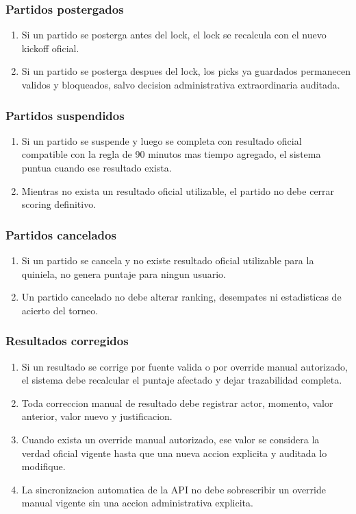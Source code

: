 \subsubsection{Partidos postergados}

\begin{enumerate}
  \item Si un partido se posterga antes del lock, el lock se recalcula con el nuevo kickoff oficial.
  \item Si un partido se posterga despues del lock, los picks ya guardados permanecen validos y bloqueados, salvo decision administrativa extraordinaria auditada.
\end{enumerate}

\subsubsection{Partidos suspendidos}

\begin{enumerate}
  \item Si un partido se suspende y luego se completa con resultado oficial compatible con la regla de 90 minutos mas tiempo agregado, el sistema puntua cuando ese resultado exista.
  \item Mientras no exista un resultado oficial utilizable, el partido no debe cerrar scoring definitivo.
\end{enumerate}

\subsubsection{Partidos cancelados}

\begin{enumerate}
  \item Si un partido se cancela y no existe resultado oficial utilizable para la quiniela, no genera puntaje para ningun usuario.
  \item Un partido cancelado no debe alterar ranking, desempates ni estadisticas de acierto del torneo.
\end{enumerate}

\subsubsection{Resultados corregidos}

\begin{enumerate}
  \item Si un resultado se corrige por fuente valida o por override manual autorizado, el sistema debe recalcular el puntaje afectado y dejar trazabilidad completa.
  \item Toda correccion manual de resultado debe registrar actor, momento, valor anterior, valor nuevo y justificacion.
  \item Cuando exista un override manual autorizado, ese valor se considera la verdad oficial vigente hasta que una nueva accion explicita y auditada lo modifique.
  \item La sincronizacion automatica de la API no debe sobrescribir un override manual vigente sin una accion administrativa explicita.
\end{enumerate}

